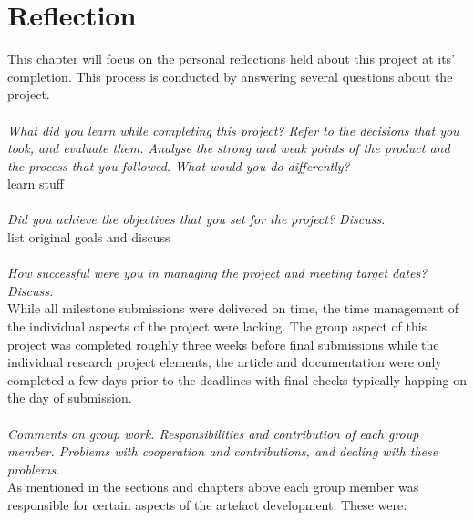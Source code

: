 
\chapter{Reflection} %

\label{Chapter5} %
This chapter will focus on the personal reflections held about this project at its' completion. This process is conducted by answering several questions about the project.
\\\\
\indent \textit{What did you learn while completing this project? Refer to the decisions that you took, and evaluate them. Analyse the strong and weak points of the product and the process that you followed. What would you do differently?}
\\
learn stuff
\\\\
\indent \textit{Did you achieve the objectives that you set for the project? Discuss.}
\\
list original goals and discuss
\\\\
\indent \textit{How successful were you in managing the project and meeting target dates? Discuss.}
\\
While all milestone submissions were delivered on time, the time management of the individual aspects of the project were lacking. The group aspect of this project was completed roughly three weeks before final submissions while the individual research project elements, the article and documentation were only completed a few days prior to the deadlines with final checks typically happing on the day of submission. 
\\\\
\indent \textit{Comments on group work. Responsibilities and contribution of each group member. Problems with cooperation and contributions, and dealing with these problems.}
\\
As mentioned in the sections and chapters above each group member was responsible for certain aspects of the artefact development. These were: %
